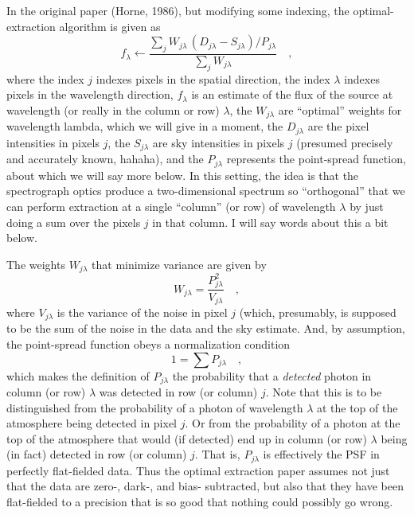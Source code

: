 \documentclass[12pt, letterpaper]{article}
\begin{document}
In the original paper (Horne, 1986), but modifying some indexing, the
optimal-extraction algorithm is given as
\begin{equation}
f_\lambda \leftarrow \frac{\sum_j W_{j\lambda}\,(D_{j\lambda} - S_{j\lambda}) / P_{j\lambda}}%
                          {\sum_j W_{j\lambda}}
\quad ,
\end{equation}
where
the index $j$ indexes pixels in the spatial direction,
the index $\lambda$ indexes pixels in the wavelength direction,
$f_\lambda$ is an estimate of the flux of the source at wavelength
(or really in the column or row) $\lambda$,
the $W_{j\lambda}$ are ``optimal'' weights for wavelength lambda,
which we will give in a moment,
the $D_{j\lambda}$ are the pixel intensities in pixels $j$,
the $S_{j\lambda}$ are sky intensities in pixels $j$
(presumed precisely and accurately known, hahaha), and
the $P_{j\lambda}$ represents the point-spread function,
about which we will say more below.
In this setting, the idea is that the spectrograph optics produce a
two-dimensional spectrum so ``orthogonal'' that we can perform
extraction at a single ``column'' (or row) of wavelength $\lambda$ by
just doing a sum over the pixels $j$ in that column.
I will say words about this a bit below.

The weights $W_{j\lambda}$ that minimize variance are given by
\begin{equation}
W_{j\lambda} = \frac{P_{j\lambda}^2}{V_{j\lambda}}
\quad ,
\end{equation}
where $V_{j\lambda}$ is the variance of the noise in pixel $j$ (which,
presumably, is supposed to be the sum of the noise in the data and the
sky estimate.
And, by assumption, the point-spread function obeys a normalization
condition
\begin{equation}
1 = \sum P_{j\lambda}
\quad ,
\end{equation}
which makes the definition of $P_{j\lambda}$ the probability that a
\emph{detected} photon in column (or row) $\lambda$ was detected in
row (or column) $j$.
Note that this is to be distinguished from the probability of a photon
of wavelength $\lambda$ at the top of the atmosphere being detected in
pixel $j$.
Or from the probability of a photon at the top of the atmosphere that
would (if detected) end up in column (or row) $\lambda$ being (in
fact) detected in row (or column) $j$.
That is, $P_{j\lambda}$ is effectively the PSF in perfectly
flat-fielded data.
Thus the optimal extraction paper assumes not just that the data are
zero-, dark-, and bias- subtracted, but also that they have been
flat-fielded to a precision that is so good that nothing could
possibly go wrong.
\end{document}
